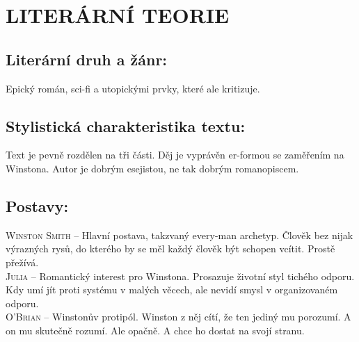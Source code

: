 \documentclass[A4paper]{extarticle} %
\begin{document}
\section*{LITERÁRNÍ TEORIE}

\subsection*{Literární druh a žánr:}
\noindent 
Epický román, sci-fi a utopickými prvky, které ale kritizuje.





\subsection*{Stylistická charakteristika textu:}
\noindent
Text je pevně rozdělen na tři části. Děj je vyprávěn er-formou se zaměřením na Winstona. Autor je dobrým esejistou, ne tak dobrým romanopiscem.

\subsection*{Postavy:}
\noindent
\textsc{Winston Smith} -- Hlavní postava, takzvaný every-man archetyp. Člověk bez nijak výrazných rysů, do kterého by se měl každý člověk být schopen vcítit. Prostě přežívá.\\
\textsc{Julia} -- Romantický interest pro Winstona. Prosazuje životní styl tichého odporu. Kdy umí jít proti systému v malých věcech, ale nevidí smysl v organizovaném odporu. \\
\textsc{O'Brian} -- Winstonův protipól. Winston z něj cítí, že ten jediný mu porozumí. A on mu skutečně rozumí. Ale opačně. A chce ho dostat na svojí stranu.
\end{document}
